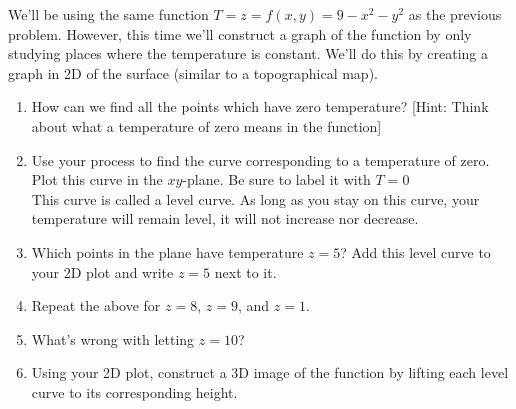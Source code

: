 \begin{problem}\label{prob:intro to contour plots}
%
%
We'll be using the same function $T=z=f(x,y)=9-x^2-y^2$ as the previous problem.  However, this time we'll construct a graph of the function by only studying places where the temperature is constant.  We'll do this by creating a graph in 2D of the surface (similar to a topographical map). %

 \begin{enumerate}
  \item How can we find all the points which have zero temperature? [Hint: Think about what a temperature of zero means in the function]
	\item Use your process to find the curve corresponding to a temperature of zero. Plot this curve in the $xy$-plane. Be sure to label it with $T=0$\\
	This curve is called a level curve. As long as you stay on this curve, your temperature will remain level, it will not increase nor decrease. 
  \item Which points in the plane have temperature $z=5$?  Add this level curve to your 2D plot and write $z=5$ next to it.
  \item Repeat the above for $z=8$, $z=9$, and $z=1$. 
	\item What's wrong with letting $z=10$? 
  \item Using your 2D plot, construct a 3D image of the function by lifting each level curve to its corresponding height.
 \end{enumerate}
\end{problem}

